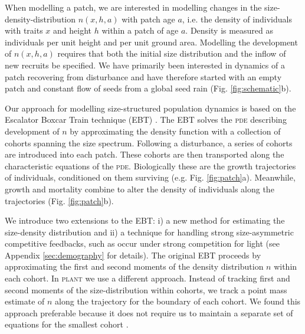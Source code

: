 \documentclass[a4paper,11pt]{article}
\newcommand{\plant}{\textsc{plant}}
\begin{document}
When modelling a patch, we are interested in modelling changes in the size-
density-distribution \(n(x,h,a)\) with patch age \(a\), i.e. the density of
individuals with traits \(x\) and height \(h\) within a patch of age \(a\).
Density is measured as individuals per unit height and per unit ground area.
Modelling the development of  \(n(x,h,a)\) requires that both the initial size
distribution and the inflow of new recruits be specified. We have primarily
been interested in dynamics of a patch recovering from disturbance and have
therefore started with an empty patch and constant flow of seeds from a global
seed rain (Fig. \ref{fig:schematic}b).

Our approach for modelling size-structured population dynamics
is based on the Escalator Boxcar Train technique (\textsc{EBT})
\citep{Deroos-1988, Deroos-1992, Deroos-1997}. The \textsc{EBT} solves the \textsc{pde}
describing development of \(n\) by approximating the density function
with a collection of cohorts spanning the size spectrum. Following a
disturbance, a series of cohorts are introduced into each patch. These
cohorts are then transported along the characteristic equations of the
\textsc{pde}. Biologically these are the growth trajectories of individuals,
conditioned on them surviving (e.g. Fig. \ref{fig:patch}a). Meanwhile,
growth and mortality combine to alter the density of individuals along
the trajectories (Fig. \ref{fig:patch}b).

We introduce two extensions to the \textsc{EBT}: i) a new method for estimating
the size-density distribution and ii) a technique for handling strong
size-asymmetric competitive feedbacks, such as occur under strong
competition for light (see Appendix \ref{sec:demography} for
details). The original \textsc{EBT} \citep{Deroos-1988,
  Deroos-1992, Deroos-1997} proceeds by approximating the first and
second moments of the density distribution \(n\) within each
cohort. In {\plant} we use a different approach. Instead of tracking
first and second moments of the size-distribution within cohorts, we
track a point mass estimate of \(n\) along the trajectory for the
boundary of each cohort. We found this approach preferable because it
does not require us to maintain a separate set of equations for the
smallest cohort \citep{Deroos-1997}.
\end{document}
